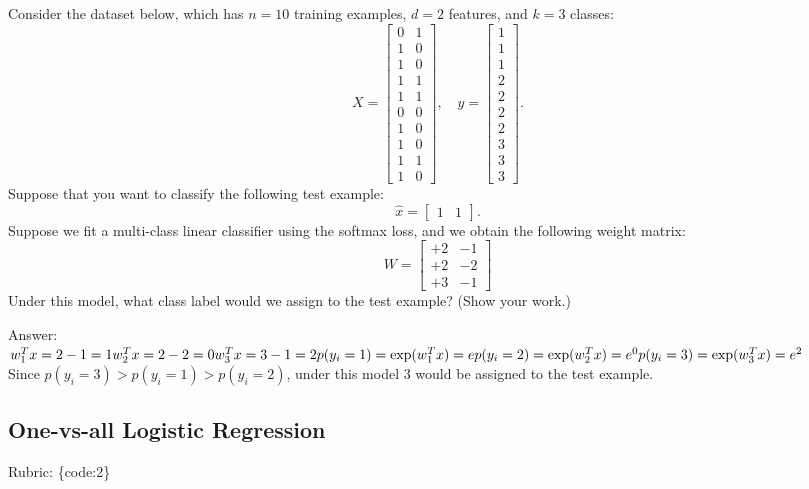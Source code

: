 \documentclass{article}
\def\rubric#1{\gre{Rubric: \{#1\}}}{}
\def\ans#1{\par\gre{Answer: #1}}
\def\blu#1{{\color{blu}#1}}
\def\gre#1{{\color{gre}#1}}
\begin{document}
Consider the dataset below, which has $n=10$ training examples, $d=2$ features, and $k=3$ classes:
\[
X = \begin{bmatrix}0 & 1\\1 & 0\\ 1 & 0\\ 1 & 1\\ 1 & 1\\ 0 & 0\\  1 & 0\\  1 & 0\\  1 & 1\\  1 &0\end{bmatrix}, \quad y = \begin{bmatrix}1\\1\\1\\2\\2\\2\\2\\3\\3\\3\end{bmatrix}.
\]
Suppose that you want to classify the following test example:
\[
\hat{x} = \begin{bmatrix}1 & 1\end{bmatrix}.
\]
Suppose we fit a multi-class linear classifier using the softmax loss, and we obtain the following weight matrix:
\[
W =
\begin{bmatrix}
+2 & -1\\
+2 & -2\\
+3 & -1
\end{bmatrix}
\]
\blu{Under this model, what class label would we assign to the test example? (Show your work.)}

\ans{\\
	$w_1^Tx = 2-1 = 1\\
	w_2^Tx = 2-2 = 0\\
	w_3^Tx =  3-1 = 2\\
	p(y_i=1) = \exp(w_1^Tx) = e\\
	p(y_i=2) = \exp(w_2^Tx) = e^0\\
	p(y_i=3) = \exp(w_3^Tx) = e^2$\\
	Since $p(y_i=3) > p(y_i=1) > p(y_i=2)$, under this model 3 would be assigned to the test example.
}



\subsection{One-vs-all Logistic Regression}
\rubric{code:2}
\end{document}
